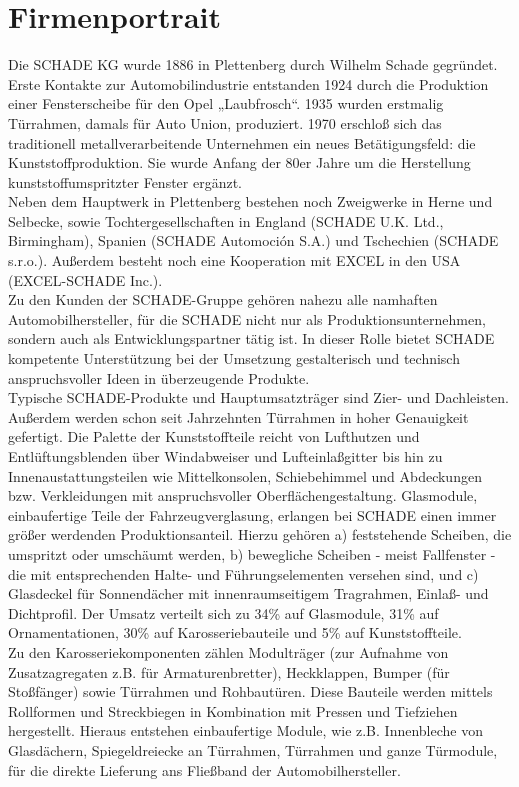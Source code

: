 \documentclass[12pt,a4paper,parskip,twoside,BCOR5mm,headsepline]{scrartcl}
\begin{document}
\section{Firmenportrait}
Die SCHADE KG wurde 1886 in Plettenberg durch Wilhelm Schade gegründet. Erste Kontakte zur Automobilindustrie entstanden 1924 durch die Produktion einer Fensterscheibe für den Opel „Laubfrosch“. 1935 wurden erstmalig Türrahmen, damals für Auto Union, produziert. 1970 erschloß sich das traditionell metallverarbeitende Unternehmen ein neues Betätigungsfeld: die Kunststoffproduktion. Sie wurde Anfang der 80er Jahre um die Herstellung kunststoffumspritzter Fenster ergänzt.\\
Neben dem Hauptwerk in Plettenberg bestehen noch Zweigwerke in Herne und Selbecke, sowie Tochtergesellschaften in England (SCHADE U.K. Ltd., Birmingham), Spanien (SCHADE Automoción S.A.) und Tschechien (SCHADE s.r.o.). Außerdem besteht noch eine Kooperation mit EXCEL in den USA (EXCEL-SCHADE Inc.).\\
Zu den Kunden der SCHADE-Gruppe gehören nahezu alle namhaften Automobilhersteller, für die SCHADE nicht nur als Produktionsunternehmen, sondern auch als Entwicklungspartner tätig ist. In dieser Rolle bietet SCHADE kompetente Unterstützung bei der Umsetzung gestalterisch und technisch anspruchsvoller Ideen in überzeugende Produkte.\\
Typische SCHADE-Produkte und Hauptumsatzträger sind Zier- und Dachleisten. Außerdem werden schon seit Jahrzehnten Türrahmen in hoher Genauigkeit gefertigt. Die Palette der Kunststoffteile reicht von Lufthutzen und Entlüftungsblenden über Windabweiser und Lufteinlaßgitter bis hin zu Innenaustattungsteilen wie Mittelkonsolen, Schiebehimmel und Abdeckungen bzw. Verkleidungen mit anspruchsvoller Oberflächengestaltung. Glasmodule, einbaufertige Teile der Fahrzeugverglasung, erlangen bei SCHADE einen immer größer werdenden Produktionsanteil. Hierzu gehören a) feststehende Scheiben, die umspritzt oder umschäumt werden, b) bewegliche Scheiben - meist Fallfenster - die mit entsprechenden Halte- und Führungselementen versehen sind, und c) Glasdeckel für Sonnendächer mit innenraumseitigem Tragrahmen, Einlaß- und Dichtprofil.
Der Umsatz verteilt sich zu 34\% auf Glasmodule, 31\% auf Ornamentationen, 30\% auf Karosseriebauteile und 5\% auf Kunststoffteile.\\
Zu den Karosseriekomponenten zählen Modulträger (zur Aufnahme von Zusatzagregaten z.B. für Armaturenbretter), Heckklappen, Bumper (für Stoßfänger) sowie Türrahmen und Rohbautüren.
Diese Bauteile werden mittels Rollformen und Streckbiegen in Kombination mit Pressen und Tiefziehen hergestellt. Hieraus entstehen einbaufertige Module, wie z.B. Innenbleche von Glasdächern, Spiegeldreiecke an Türrahmen, Türrahmen und ganze Türmodule, für die direkte Lieferung ans Fließband der Automobilhersteller.
\end{document}
